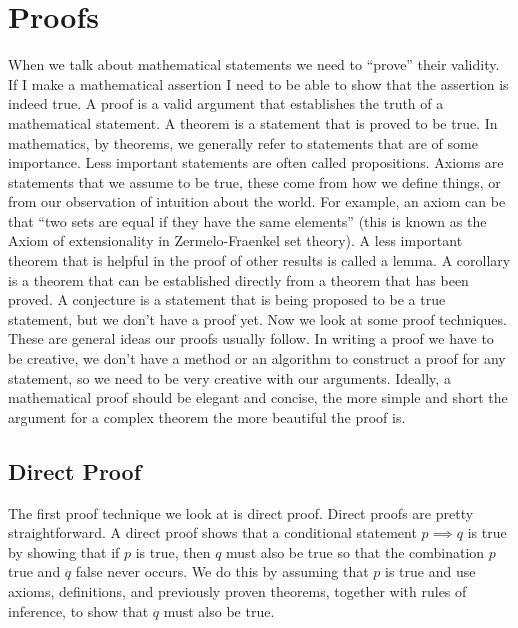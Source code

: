 \documentclass[12pt]{exam}
\begin{document}


\section*{Proofs}
When we talk about mathematical statements we need to ``prove'' their validity. If I make a mathematical assertion I need to be able to show that the assertion is indeed true.
A proof is a valid argument that establishes the truth of a mathematical statement. 
A theorem is a statement that is proved to be true. In mathematics, by theorems, we generally refer to statements that are of some importance. Less important statements are often called propositions.
Axioms are statements that we assume to be true, these come from how we define things, or from our observation of intuition about the world. For example, an axiom can be that ``two sets are equal if they have the same elements'' (this is known as the Axiom of extensionality in Zermelo-Fraenkel set theory).
A less important theorem that is helpful in the proof of other results is called a lemma. A corollary is a theorem that can be established directly from a theorem that has been proved. A conjecture is a statement that is being proposed to be a true statement, but we don't have a proof yet.
Now we look at some proof techniques. These are general ideas our proofs usually follow. In writing a proof we have to be creative, we don't have a method or an algorithm to construct a proof for any statement, so we need to be very creative with our arguments.
Ideally, a mathematical proof should be elegant and concise, the more simple and short the argument for a complex theorem the more beautiful the proof is.

\subsection*{Direct Proof}
The first proof technique we look at is direct proof. Direct proofs are pretty straightforward.
A direct proof shows that a conditional statement $p \implies q$ is true by showing that if $p$ is true, then $q$ must also be true so that the combination $p$ true and $q$ false never occurs. We do this by assuming that $p$ is true and use axioms, definitions, and previously proven theorems, together with rules of inference, to show that $q$ must also be true.
\end{document}
